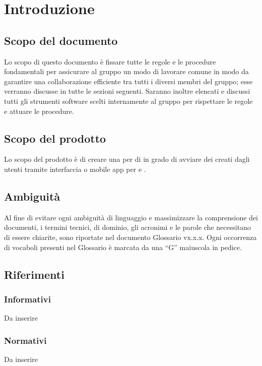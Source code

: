 \newpage
\section{Introduzione}
\subsection{Scopo del documento}
Lo scopo di questo documento è fissare tutte le regole e le procedure fondamentali per assicurare al gruppo un modo di lavorare comune in modo da garantire una collaborazione efficiente tra tutti i diversi membri del gruppo; esse verranno discusse in tutte le sezioni seguenti.
Saranno inoltre elencati e discussi tutti gli strumenti software scelti internamente al gruppo per rispettare le regole e attuare le procedure.


\subsection{Scopo del prodotto}
Lo scopo del prodotto è di creare una  per  di  in grado di avviare dei  creati dagli utenti tramite interfaccia  o mobile app per  e .
\subsection{Ambiguità}
Al fine di evitare ogni ambiguità di linguaggio e massimizzare la comprensione dei
documenti, i termini tecnici, di dominio, gli acronimi e le parole che necessitano di
essere chiarite, sono riportate nel documento Glossario vx.x.x.
Ogni occorrenza di vocaboli presenti nel Glossario è marcata da una “G” maiuscola in
pedice.
\subsection{Riferimenti}
\subsubsection{Informativi}
Da inserire
\subsubsection{Normativi}
Da inserire